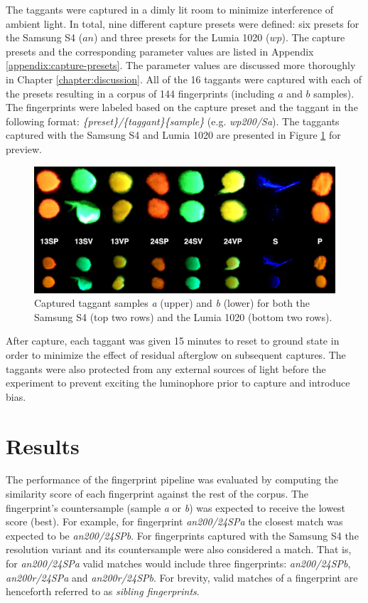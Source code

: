 \documentclass[thesis.tex]{subfiles}
\begin{document}
The taggants were captured in a dimly lit room to minimize interference of ambient light. In total, nine different capture presets were defined: six presets for the Samsung S4 ($an$) and three presets for the Lumia 1020 ($wp$). The capture presets and the corresponding parameter values are listed in Appendix \ref{appendix:capture-presets}. The parameter values are discussed more thoroughly in Chapter \ref{chapter:discussion}. All of the 16 taggants were captured with each of the presets resulting in a corpus of 144 fingerprints (including $a$ and $b$ samples). The fingerprints were labeled based on the capture preset and the taggant in the following format: \emph{\{preset\}/\{taggant\}\{sample\}} (e.g. \emph{wp200/Sa}). The taggants captured with the Samsung S4 and Lumia 1020 are presented in Figure \ref{figure:taggants} for preview.

\begin{figure}[h]
\label{figure:taggants}
\centering \includegraphics[width=\textwidth,height=\textheight,keepaspectratio=true]{images/experiment/taggants}
\caption{Captured taggant samples \emph{a} (upper) and \emph{b} (lower) for both the Samsung S4 (top two rows) and the Lumia 1020 (bottom two rows).}
\end{figure}

After capture, each taggant was given 15 minutes to reset to ground state in order to minimize the effect of residual afterglow on subsequent captures. The taggants were also protected from any external sources of light before the experiment to prevent exciting the luminophore prior to capture and introduce bias.

\section{Results}
\label{chapter:results}

The performance of the fingerprint pipeline was evaluated by computing the similarity score of each fingerprint against the rest of the corpus. The fingerprint's countersample (sample \emph{a} or \emph{b}) was expected to receive the lowest score (best). For example, for fingerprint \emph{an200/24SPa} the closest match was expected to be \emph{an200/24SPb}. For fingerprints captured with the Samsung S4 the resolution variant and its countersample were also considered a match. That is, for \emph{an200/24SPa} valid matches would include three fingerprints: \emph{an200/24SPb}, \emph{an200r/24SPa} and \emph{an200r/24SPb}. For brevity, valid matches of a fingerprint are henceforth referred to as \emph{sibling fingerprints}.
\end{document}
